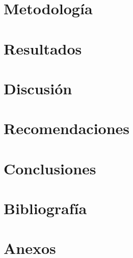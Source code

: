 \documentclass[12pt,letterpaper]{article}
\begin{document}
	\section{Metodología}
	
	
	\section{Resultados}
	
	
	\section{Discusión}
	
	
	\section{Recomendaciones}
	
	
	\section{Conclusiones}
	
	
	\clearpage
	\section*{Bibliografía}
	\printbibliography[heading=none] %
	
	\appendix
	\clearpage
	\section{Anexos}
	
	
\end{document}
